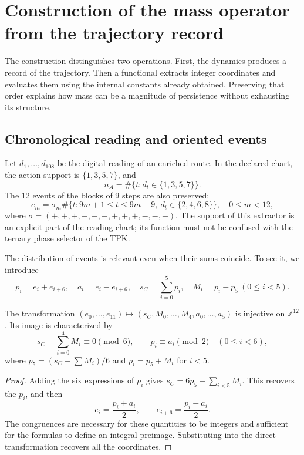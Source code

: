 \section{Construction of the mass operator from the trajectory record}
\label{vi:vi:sec:operador-masa}

The construction distinguishes two operations. First, the dynamics produces
a record of the trajectory. Then a functional extracts integer
coordinates and evaluates them using the internal constants already obtained.
Preserving that order explains how mass can be a magnitude of
persistence without exhausting its structure.

\subsection{Chronological reading and oriented events}

Let \(d_1,\ldots,d_{108}\) be the digital reading of an enriched route.
In the declared chart, the action support is \(\{1,3,5,7\}\), and
\[
 n_A=\#\{t:d_t\in\{1,3,5,7\}\}.
\]
The \(12\) events of the blocks of \(9\) steps are also preserved:
\[
 e_m=\sigma_m\#\{t:9m+1\le t\le9m+9,\ d_t\in\{2,4,6,8\}\},
 \quad 0\le m<12,
\]
where \(\sigma=(+,+,+,-,-,-,+,+,+,-,-,-)\). The support of this
extractor is an explicit part of the reading chart; its function must
not be confused with the ternary phase selector of the TPK.

The distribution of events is relevant even when their sums
coincide. To see it, we introduce
\[
 p_i=e_i+e_{i+6},\quad a_i=e_i-e_{i+6},\quad
 s_C=\sum_{i=0}^{5}p_i,\quad M_i=p_i-p_5\ (0\le i<5).
\]

\begin{proposition}
\label{vi:vi:prop:eventos}
The transformation \((e_0,\ldots,e_{11})\mapsto(s_C,M_0,\ldots,M_4,a_0,\ldots,a_5)\)
is injective on \(\mathbb Z^{12}\). Its image is characterized by
\[
 s_C-\sum_{i=0}^4M_i\equiv0\pmod6,
 \qquad p_i\equiv a_i\pmod2\quad(0\le i<6),
\]
where \(p_5=(s_C-\sum M_i)/6\) and \(p_i=p_5+M_i\) for \(i<5\).
\end{proposition}
\begin{proof}
Adding the six expressions of \(p_i\) gives
\(s_C=6p_5+\sum_{i<5}M_i\). This recovers the \(p_i\), and then
\[
 e_i=\frac{p_i+a_i}{2},\qquad
 e_{i+6}=\frac{p_i-a_i}{2}.
\]
The congruences are necessary for these quantities to be integers and
sufficient for the formulas to define an integral preimage. Substituting
into the direct transformation recovers all the coordinates.
\end{proof}

